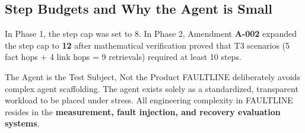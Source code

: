 \subsection{Step Budgets and Why the Agent is Small}
In Phase 1, the step cap was set to 8. In Phase 2, Amendment \textbf{A-002} expanded the step cap to \textbf{12} after mathematical verification proved that T3 scenarios (5 fact hops + 4 link hops = 9 retrievals) required at least 10 steps.

\begin{callout}[primary]{The Agent is the Test Subject, Not the Product}
FAULTLINE deliberately avoids complex agent scaffolding. The agent exists solely as a standardized, transparent workload to be placed under stress. All engineering complexity in FAULTLINE resides in the \textbf{measurement, fault injection, and recovery evaluation systems}.
\end{callout}
